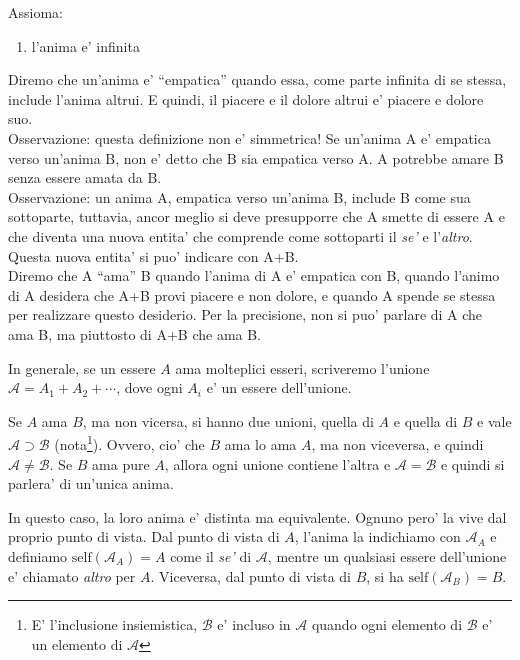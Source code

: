 Assioma:
\begin{enumerate}
    \item l'anima e' infinita
\end{enumerate}

Diremo che un'anima e' ``empatica'' quando essa, come parte infinita di se stessa, include l'anima altrui. E quindi, il piacere e il dolore altrui e' piacere e dolore suo. \\
Osservazione: questa definizione non e' simmetrica! Se un'anima A e' empatica verso un'anima B, non e' detto che B sia empatica verso A. A potrebbe amare B senza essere amata da B. \\
Osservazione: un anima A, empatica verso un'anima B, include B come sua sottoparte, tuttavia, ancor meglio si deve presupporre che A smette di essere A e che diventa una nuova entita' che comprende come sottoparti il \emph{se'} e l'\emph{altro}. Questa nuova entita' si puo' indicare con A+B. \\

Diremo che A ``ama'' B quando l'anima di A e' empatica con B, quando l'animo di A desidera che A+B provi piacere e non dolore, e quando A spende se stessa per realizzare questo desiderio. Per la precisione, non si puo' parlare di A che ama B, ma piuttosto di A+B che ama B. 

In generale, se un essere $A$ ama molteplici esseri, scriveremo l'unione $\mathcal{A}=A_1+A_2+\cdots$, dove ogni $A_i$ e' un essere dell'unione.

\def\self{\textrm{self}}
\def\other{\textrm{other}}

Se $A$ ama $B$, ma non vicersa, si hanno due unioni, quella di $A$ e quella di $B$ e vale $\mathcal{A} \supset \mathcal{B}$ (nota\footnote{E' l'inclusione insiemistica, $\mathcal{B}$ e' incluso in $\mathcal{A}$ quando ogni elemento di $\mathcal{B}$ e' un elemento di $\mathcal{A}$}).  Ovvero, cio' che $B$ ama lo ama $A$, ma non viceversa, e quindi $\mathcal{A} \neq \mathcal{B}$. Se $B$ ama pure $A$, allora ogni unione contiene l'altra e $\mathcal{A} = \mathcal{B}$ e quindi si parlera' di un'unica anima. 

In questo caso, la loro anima e' distinta ma equivalente.  Ognuno pero' la vive dal proprio punto di vista. Dal punto di vista di $A$, l'anima la indichiamo con $\mathcal{A}_A$ e definiamo $\textrm{self}(\mathcal{A}_A)=A$ come il \emph{se'} di $\mathcal{A}$, mentre un qualsiasi essere dell'unione e' chiamato \emph{altro} per $A$. Viceversa, dal punto di vista di $B$, si ha $\textrm{self}(\mathcal{A}_B)=B$.

